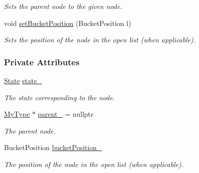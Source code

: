 \begin{DoxyCompactItemize}
\begin{DoxyCompactList}\small\item\em Sets the parent node to the given node. \end{DoxyCompactList}\item 
void \hyperlink{structSearchNode_a5552fc833c7a3e97f854762ddcd1b948}{set\+Bucket\+Position} (Bucket\+Position l)
\begin{DoxyCompactList}\small\item\em Sets the position of the node in the open list (when applicable). \end{DoxyCompactList}\end{DoxyCompactItemize}
\subsubsection*{Private Attributes}
\begin{DoxyCompactItemize}
\item 
\hyperlink{structSearchNode_a2dcd6df22e4aa33cb18ef2fb6bd626c4}{State} \hyperlink{structSearchNode_ac3beec312b8aea5a96c71b0deac367b5}{state\+\_\+}\hypertarget{structSearchNode_ac3beec312b8aea5a96c71b0deac367b5}{}\label{structSearchNode_ac3beec312b8aea5a96c71b0deac367b5}

\begin{DoxyCompactList}\small\item\em The state corresponding to the node. \end{DoxyCompactList}\item 
\hyperlink{structSearchNode_ad78b2656f529b6dd04b58957267cfed8}{My\+Type} $\ast$ \hyperlink{structSearchNode_a7eafd7fce90b8a94b96c0e3332d4eb20}{parent\+\_\+} = nullptr\hypertarget{structSearchNode_a7eafd7fce90b8a94b96c0e3332d4eb20}{}\label{structSearchNode_a7eafd7fce90b8a94b96c0e3332d4eb20}

\begin{DoxyCompactList}\small\item\em The parent node. \end{DoxyCompactList}\item 
Bucket\+Position \hyperlink{structSearchNode_af4a65644f9b3aa30b67e15dd8f988b6d}{bucket\+Position\+\_\+}\hypertarget{structSearchNode_af4a65644f9b3aa30b67e15dd8f988b6d}{}\label{structSearchNode_af4a65644f9b3aa30b67e15dd8f988b6d}

\begin{DoxyCompactList}\small\item\em The position of the node in the open list (when applicable). \end{DoxyCompactList}\end{DoxyCompactItemize}


